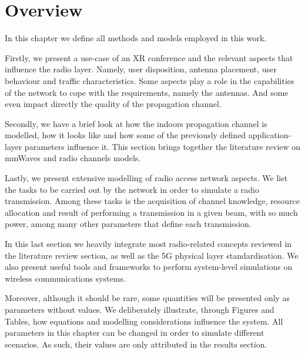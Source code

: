 \section*{Overview}

In this chapter we define all methods and models employed in this work.

Firstly, we present a use-case of an XR conference and the relevant aspects that influence the radio layer. Namely, user disposition, antenna placement, user behaviour and traffic characteristics. Some aspects play a role in the 
capabilities of the network to cope with the requirements, namely the antennas. And some even impact directly the quality of the propagation channel.

Secondly, we have a brief look at how the indoors propagation channel is modelled, how it looks like and how some of the previously defined application-layer parameters influence it. This section brings together the literature review on mmWaves and radio channels models.


Lastly, we present extensive modelling of radio access network aspects. We list the tasks to be carried out by the network in order to simulate a radio transmission. Among these tasks is the acquisition of channel knowledge, resource allocation and result of performing a transmission in a given beam, with so much power, among many other parameters that define each transmission.

In this last section we heavily integrate most radio-related concepts reviewed in the literature review section, as well as the 5G physical layer standardisation. We also present useful tools and frameworks to perform system-level simulations on wireless communications systems.


Moreover, although it should be rare, some quantities will be presented only as parameters without values. We deliberately illustrate, through Figures and Tables, how equations and modelling considerations influence the system. All parameters in this chapter can be changed in order to simulate different scenarios. As such, their values are only attributed in the results section.